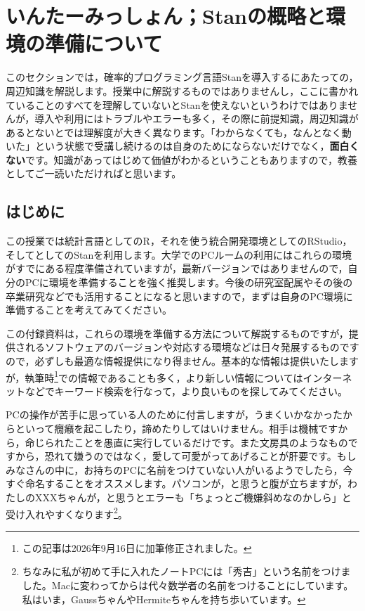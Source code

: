 \documentclass{ltjsbook}
\begin{document}
\VerbatimFootnotes
\chapter{いんたーみっしょん；Stanの概略と環境の準備について}
\label{PrepareStan}

このセクションでは，確率的プログラミング言語Stanを導入するにあたっての，周辺知識を解説します。授業中に解説するものではありませんし，ここに書かれていることのすべてを理解していないとStanを使えないというわけではありませんが，導入や利用にはトラブルやエラーも多く，その際に前提知識，周辺知識があるとないとでは理解度が大きく異なります。「わからなくても，なんとなく動いた」という状態で受講し続けるのは自身のためにならないだけでなく，\textbf{面白くない}です。知識があってはじめて価値がわかるということもありますので，教養としてご一読いただければと思います。

\section{はじめに}
この授業では統計言語としてのR，それを使う統合開発環境としてのRStudio，そしてとしてのStanを利用します。大学でのPCルームの利用にはこれらの環境がすでにある程度準備されていますが，最新バージョンではありませんので，自分のPCに環境を準備することを強く推奨します。今後の研究室配属やその後の卒業研究などでも活用することになると思いますので，まずは自身のPC環境に準備することを考えてみてください。

この付録資料は，これらの環境を準備する方法について解説するものですが，提供されるソフトウェアのバージョンや対応する環境などは日々発展するものですので，必ずしも最適な情報提供になり得ません。基本的な情報は提供いたしますが，執筆時\footnote{この記事は2026年9月16日に加筆修正されました。}での情報であることも多く，より新しい情報についてはインターネットなどでキーワード検索を行なって，より良いものを探してみてください。

PCの操作が苦手に思っている人のために付言しますが，うまくいかなかったからといって癇癪を起こしたり，諦めたりしてはいけません。相手は機械ですから，命じられたことを愚直に実行しているだけです。また文房具のようなものですから，恐れて嫌うのではなく，愛して可愛がってあげることが肝要です。もしみなさんの中に，お持ちのPCに名前をつけていない人がいるようでしたら，今すぐ命名することをオススメします。パソコンが，と思うと腹が立ちますが，わたしのXXXちゃんが，と思うとエラーも「ちょっとご機嫌斜めなのかしら」と受け入れやすくなります\footnote{ちなみに私が初めて手に入れたノートPCには「秀吉」という名前をつけました。Macに変わってからは代々数学者の名前をつけることにしています。私はいま，GaussちゃんやHermiteちゃんを持ち歩いています。}。
\end{document}
